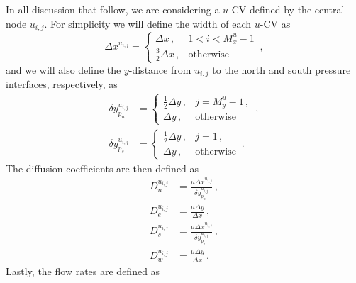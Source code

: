 \documentclass{article}
\begin{document}
In all discussion that follow, we are considering a $u$-CV defined by the central node $u_{i,j}$. For simplicity we will define the width of each $u$-CV as
\begin{equation}
	\Delta x^{u_{i,j}} = \begin{cases}
		\Delta x\,, & 1 < i < M_x^u - 1 \\
		\frac{3}{2} \Delta x\,, & \text{otherwise}
	\end{cases}\,,
\end{equation}
and we will also define the $y$-distance from $u_{i,j}$ to the north and south pressure interfaces, respectively, as
\begin{subequations}
	\begin{align}
		\delta y^{u_{i,j}}_{p_n} & = \begin{cases}
		\frac{1}{2} \Delta y\,, & j = M_y^u - 1\,, \\
		\Delta y\,, & \text{otherwise}
		\end{cases}\,, \\
		\delta y^{u_{i,j}}_{p_s} & = \begin{cases}
		\frac{1}{2} \Delta y\,, & j = 1\,, \\
		\Delta y\,, & \text{otherwise}
		\end{cases}\,.
	\end{align}
\end{subequations}
The diffusion coefficients are then defined as
\begin{subequations}
	\begin{align}
		D_n^{u_{i,j}} & = \frac{\mu \Delta x^{u_{i,j}}}{\delta y^{u_{i,j}}_{p_n}}\,,\\
		D_e^{u_{i,j}} & = \frac{\mu\Delta y}{\Delta x}\,,\\
		D_s^{u_{i,j}} & = \frac{\mu \Delta x^{u_{i,j}}}{\delta y^{u_{i,j}}_{p_s}}\,,\\
		D_w^{u_{i,j}} & = \frac{\mu\Delta y}{\Delta x}\,.
	\end{align}
\end{subequations}
Lastly, the flow rates are defined as
\end{document}
